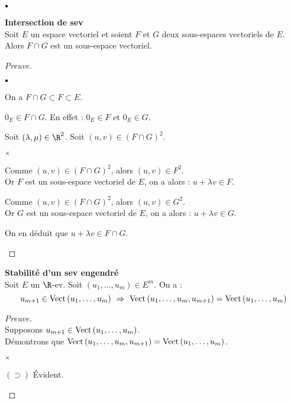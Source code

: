 \documentclass[11pt]{article}%
\begin{document}
\begin{noliste}{$\scriptstyle \bullet$}
  \item {\bf Intersection de sev}\\
  Soit $E$ un espace vectoriel et soient $F$ et $G$ deux sous-espaces 
  vectoriels de $E$. Alors $F \cap G$ est un sous-espace vectoriel.

  \begin{proof}[Preuve]~
  \begin{noliste}{$\scriptstyle \bullet$}
  \item On a $F \cap G \subset F \subset E$. 
  \item $0_E \in F \cap G$. En effet : $0_E \in F$ et $0_E \in G$. 
  \item Soit $(\lambda, \mu) \in \R^2$. Soit $(u,v) \in (F \cap 
  G)^2$.
  \begin{noliste}{$\scriptstyle \times$}
    \item Comme $(u,v) \in (F\cap G)^2$, alors $(u,v) \in F^2$.\\ 
    Or $F$ est un sous-espace vectoriel de $E$, on a alors : $u 
    + \lambda v \in F$.
    
    \item Comme $(u,v) \in (F\cap G)^2$, alors $(u,v) \in G^2$.\\ 
    Or $G$ est un sous-espace vectoriel de $E$, on a alors : $u 
    + \lambda v \in G$.
  \end{noliste}
  On en déduit que $u+\lambda v \in F \cap G$.\\[-1cm]
  \end{noliste}
  \end{proof}
  
  \item {\bf Stabilité d'un sev engendré}\\
  Soit $E$ un $\R$-ev. Soit $(u_1,\hdots,u_m)\in E^m$. On a :
  \[
   u_{m+1} \in\Vect{u_1,\hdots, u_m} \ \Rightarrow \ \Vect{u_1,
   \hdots, u_m,u_{m+1}} = \Vect{u_1,\hdots, u_m}
  \]
  
  \begin{proof}[Preuve]~\\
  Supposons $u_{m+1}\in{\rm{Vect}}\left(u_1,\hdots, u_m\right)$.\\
  Démontrons que ${\rm{Vect}}\left(u_1,\hdots, u_m,u_{m+1}\right)={\rm{Vect}}\left(u_1,
  \hdots,u_m\right)$.
  \begin{noliste}{$\scriptstyle \times$}
  \item $(\supset)$ Évident.
  

\end{noliste}
\end{proof}
\end{noliste}
\end{document}
